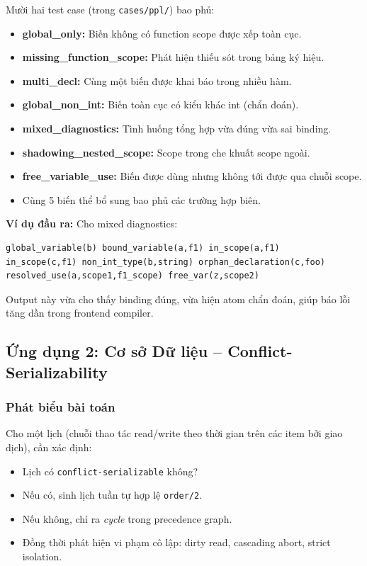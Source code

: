 \documentclass[a4paper,11pt]{article}
\begin{document}
Mười hai test case (trong \texttt{cases/ppl/}) bao phủ:
\begin{itemize}
  \item \textbf{global\_only:} Biến không có function scope được xếp toàn cục.
  \item \textbf{missing\_function\_scope:} Phát hiện thiếu sót trong bảng ký hiệu.
  \item \textbf{multi\_decl:} Cùng một biến được khai báo trong nhiều hàm.
  \item \textbf{global\_non\_int:} Biến toàn cục có kiểu khác int (chẩn đoán).
  \item \textbf{mixed\_diagnostics:} Tình huống tổng hợp vừa đúng vừa sai binding.
  \item \textbf{shadowing\_nested\_scope:} Scope trong che khuất scope ngoài.
  \item \textbf{free\_variable\_use:} Biến được dùng nhưng không tới được qua chuỗi scope.
  \item Cùng 5 biến thể bổ sung bao phủ các trường hợp biên.
\end{itemize}

\textbf{Ví dụ đầu ra:} Cho mixed diagnostics:
\begin{lstlisting}
global_variable(b) bound_variable(a,f1) in_scope(a,f1)
in_scope(c,f1) non_int_type(b,string) orphan_declaration(c,foo)
resolved_use(a,scope1,f1_scope) free_var(z,scope2)
\end{lstlisting}

Output này vừa cho thấy binding đúng, vừa hiện atom chẩn đoán, giúp báo lỗi tăng dần trong frontend compiler.

\subsection{Ứng dụng 2: Cơ sở Dữ liệu -- Conflict-Serializability}\label{subsec:db}

\subsubsection*{Phát biểu bài toán}

Cho một lịch (chuỗi thao tác read/write theo thời gian trên các item bởi giao dịch), cần xác định:
\begin{itemize}
  \item Lịch có \texttt{conflict-serializable} không?
  \item Nếu có, sinh lịch tuần tự hợp lệ \texttt{order/2}.
  \item Nếu không, chỉ ra \textit{cycle} trong precedence graph.
  \item Đồng thời phát hiện vi phạm cô lập: dirty read, cascading abort, strict isolation.
\end{itemize}
\end{document}
